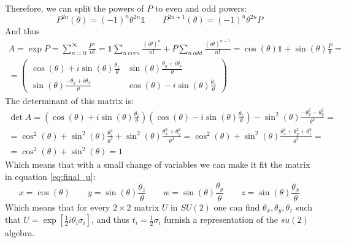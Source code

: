 \documentclass{article}
\begin{document}
Therefore, we can split the powers of $P$ to even and odd powers:
\begin{equation}
    P^{2n}(\theta) = \left(-1\right)^n\theta^{2n}\mathbb{1} \qquad P^{2n+1}(\theta) = \left(-1\right)^n\theta^{2n}P
\end{equation}
And thus
\begin{equation}
\begin{gathered}
    A = \exp P = \sum_{n=0}^\infty \frac{P^n}{n!} = \mathbb{1}\sum_{n \ even}\frac{\left(i\theta\right)^n}{n!} + P\sum_{n \ odd}\frac{\left(i\theta\right)^{n - 1}}{n!} = \cos(\theta)\mathbb{1} + \sin(\theta) \frac{P}{\theta} = \\
    = \begin{pmatrix}
        \cos(\theta) + i\sin(\theta)\frac{\theta_z}{\theta} & \sin(\theta)\frac{\theta_y + i\theta_x}{\theta} \\ 
        \sin(\theta)\frac{-\theta_y + i\theta_x}{\theta} & \cos(\theta) - i\sin(\theta)\frac{\theta_z}{\theta}
    \end{pmatrix}
\end{gathered}
\end{equation}
The determinant of this matrix is:
\begin{equation}
\begin{gathered}
    \det A = \left(\cos(\theta) + i\sin(\theta)\frac{\theta_z}{\theta}\right) \left(\cos(\theta) - i\sin(\theta)\frac{\theta_z}{\theta}\right) - \sin^2(\theta)\frac{- \theta_x^2 - \theta_y^2}{\theta^2} = 
    \\
    = \cos^2(\theta) + \sin^2(\theta)\frac{\theta_z^2}{\theta^2} + \sin^2(\theta)\frac{\theta_x^2 + \theta_y^2}{\theta^2} = \cos^2(\theta) + \sin^2(\theta)\frac{\theta_x^2 + \theta_y^2 + \theta_z^2}{\theta^2} =
    \\
    = \cos^2(\theta) + \sin^2(\theta) = 1
\end{gathered} 
\end{equation}
Which means that with a small change of variables we can make it fit the matrix in equation \ref{eq:final_u}:
\begin{equation}
    x = \cos(\theta) \qquad y = \sin(\theta)\frac{\theta_z}{\theta}
    \qquad w = \sin(\theta)\frac{\theta_y}{\theta} \qquad z = \sin(\theta)\frac{\theta_x}{\theta}
\end{equation}
Which means that for every $2\times2$ matrix $U$ in $SU(2)$ one can find $\theta_x, \theta_y, \theta_z$ such that $U = \exp\left[\frac{1}{2}i \theta_i\sigma_i\right]$, and thus $t_i = \frac{1}{2}\sigma_i$ furnish a representation of the $su(2)$ algebra. 
\end{document}
